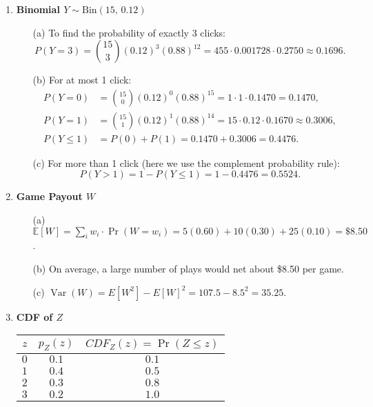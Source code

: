 \documentclass{article}
\begin{document}
\begin{enumerate}
\item \textbf{Binomial\; \(Y\sim\mathrm{Bin}(15,\,0.12)\)}  
  \begin{enumerate}
    \item[(a)] To find the probability of exactly 3 clicks:
          \[
          P(Y=3)=\binom{15}{3}(0.12)^3(0.88)^{12}
          = 455 \cdot 0.001728 \cdot 0.2750 \approx 0.1696.
          \]
    \item[(b)] For at most 1 click:
          \begin{align*}
          P(Y=0) &= \binom{15}{0}(0.12)^0(0.88)^{15} = 1 \cdot 1 \cdot 0.1470 = 0.1470,\\
          P(Y=1) &= \binom{15}{1}(0.12)^1(0.88)^{14} = 15 \cdot 0.12 \cdot 0.1670 \approx 0.3006,\\
          P(Y\le 1) &= P(0) + P(1) = 0.1470 + 0.3006 = 0.4476.
          \end{align*}
    \item[(c)] For more than 1 click (here we use the complement probability rule):
          \[
          P(Y > 1) = 1 - P(Y \le 1) = 1 - 0.4476 = 0.5524.
          \]
  \end{enumerate}



\item \textbf{Game Payout \(W\)}  
      \begin{enumerate}
        \item[(a)] \(\mathbb E[W]= \sum_{i}  w_i \cdot \Pr(W=w_i) = 5(0.60)+10(0.30)+25(0.10)=\$8.50\).
        \item[(b)] On average, a large number of plays would net about \$8.50 per game.
        \item[(c)] \(\operatorname{Var}(W)=E[W^2]-E[W]^2=107.5-8.5^2=35.25\).
      \end{enumerate}

\item \textbf{CDF of \(Z\)}  
  \begin{center}
  \begin{tabular}{c|c|c}
    $z$ & $p_Z(z)$ & $CDF_Z(z) = \Pr(Z \le z)$ \\
    \hline
    $0$ & $0.1$ & $0.1$ \\
    $1$ & $0.4$ & $0.5$ \\
    $2$ & $0.3$ & $0.8$ \\
    $3$ & $0.2$ & $1.0$
  \end{tabular}
  \end{center}


\end{enumerate}
\end{document}
